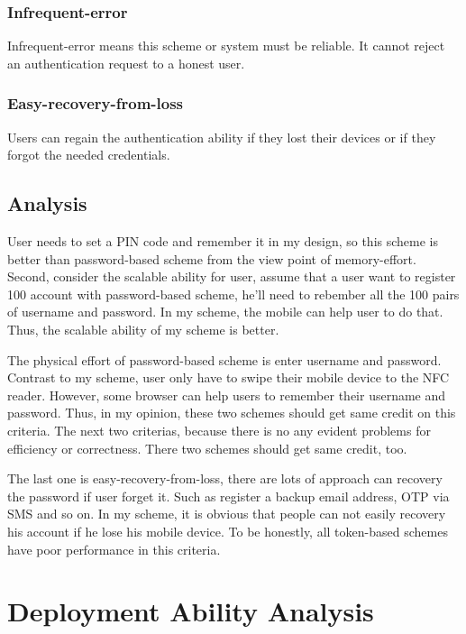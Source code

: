 \begin{CJK}{Bg5}{bsmi}
\subsubsection{Infrequent-error}

Infrequent-error means this scheme or system must be reliable. It cannot reject an authentication request to a honest user.

\subsubsection{Easy-recovery-from-loss}

Users can regain the authentication ability if they lost their devices or if they forgot the needed credentials.

\subsection{Analysis}

User needs to set a PIN code and remember it in my design, so this scheme is better than password-based scheme from the view point of memory-effort. Second, consider the scalable ability for user, assume that a user want to register 100 account with password-based scheme, he'll need to rebember all the 100 pairs of username and password. In my scheme, the mobile can help user to do that. Thus, the scalable ability of my scheme is better.

The physical effort of password-based scheme is enter username and password. Contrast to my scheme, user only have to swipe their mobile device to the NFC reader. However, some browser can help users to remember their username and password. Thus, in my opinion, these two schemes should get same credit on this criteria. The next two criterias, because there is no any evident problems for efficiency or correctness. There two schemes should get same credit, too.

The last one is easy-recovery-from-loss, there are lots of approach can recovery the password if user forget it. Such as register a backup email address, OTP via SMS and so on. In my scheme, it is obvious that people can not easily recovery his account if he lose his mobile device. To be honestly, all token-based schemes have poor performance in this criteria.

\section{Deployment Ability Analysis}


\end{CJK}
